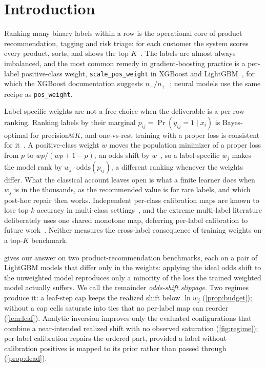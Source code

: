 \documentclass[runningheads]{llncs}
\begin{document}
\section{Introduction}
\label{sec:intro}

Ranking many binary labels within a row is the operational core of product recommendation, tagging and risk triage: for each customer the system scores every product, sorts, and shows the top $K$~\cite{Jain2016XMLLoss,Menon2019Reductions}. The labels are almost always imbalanced, and the most common remedy in gradient-boosting practice is a per-label positive-class weight, \texttt{scale\_pos\_weight} in XGBoost and LightGBM~\cite{Chen2016XGBoost,Ke2017LightGBM}, for which the XGBoost documentation suggests $n_-/n_+$~\cite{XGBoostDocs}; neural models use the same recipe as \texttt{pos\_weight}.

Label-specific weights are not a free choice when the deliverable is a per-row ranking. Ranking labels by their marginal $p_{ij}=\Pr(y_{ij}=1\mid x_i)$ is Bayes-optimal for precision@$K$, and one-vs-rest training with a proper loss is consistent for it~\cite{Menon2019Reductions,Wydmuch2018PLT}. A positive-class weight $w$ moves the population minimizer of a proper loss from $p$ to $wp/(wp+1-p)$, an odds shift by $w$~\cite{Elkan2001,Saerens2002}, so a label-specific $w_j$ makes the model rank by $w_j\cdot\mathrm{odds}(p_{ij})$, a different ranking whenever the weights differ. What the classical account leaves open is what a finite learner does when $w_j$ is in the thousands, as the recommended value is for rare labels, and which post-hoc repair then works. Independent per-class calibration maps are known to lose top-$k$ accuracy in multi-class settings~\cite{Patel2021IMax}, and the extreme multi-label literature deliberately uses one shared monotone map, deferring per-label calibration to future work~\cite{Ullah2025XMLCCalib}. Neither measures the cross-label consequence of training weights on a top-$K$ benchmark.

 gives our answer on two product-recommendation benchmarks, each on a pair of LightGBM models that differ only in the weights: applying the ideal odds shift to the unweighted model reproduces only a minority of the loss the trained weighted model actually suffers. We call the remainder \emph{odds-shift slippage}. Two regimes produce it: a leaf-step cap keeps the realized shift below $\ln w_j$ (\cref{prop:budget}); without a cap cells saturate into ties that no per-label map can reorder (\cref{lem:leaf}). Analytic inversion improves only the evaluated configurations that combine a near-intended realized shift with no observed saturation (\cref{fig:regime}); per-label calibration repairs the ordered part, provided a label without calibration positives is mapped to its prior rather than passed through (\cref{prop:dead}).
\end{document}
